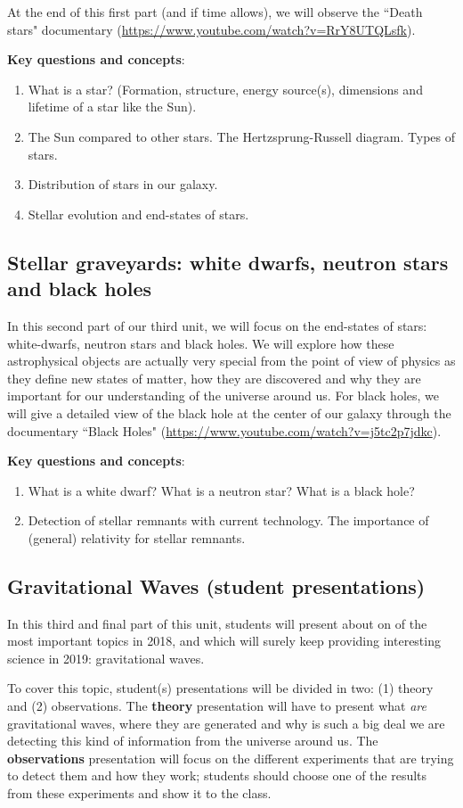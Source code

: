 \documentclass{tufte-handout}
\begin{document}
\begin{fullwidth}
At the end of this first part (and if time allows), we will observe the ``Death stars" documentary (\url{https://www.youtube.com/watch?v=RrY8UTQLsfk}).

\vspace{0.5 cm}
\noindent \textbf{Key questions and concepts}:
\begin{enumerate}
\item What is a star? (Formation, structure, energy source(s), dimensions and lifetime of a star like the Sun).
\item The Sun compared to other stars. The Hertzsprung-Russell diagram. Types of stars. 
\item Distribution of stars in our galaxy.
\item Stellar evolution and end-states of stars.
\end{enumerate}

\subsection{Stellar graveyards: white dwarfs, neutron stars and black holes}
In this second part of our third unit, we will focus on the end-states of stars: white-dwarfs, neutron stars and black holes. We will explore how these 
astrophysical objects are actually very special from the point of view of physics as they define new states of matter, how they are discovered and why 
they are important for our understanding of the universe around us. For black holes, we will give a detailed view of the black hole at the center of our 
galaxy through the documentary ``Black Holes" (\url{https://www.youtube.com/watch?v=j5tc2p7jdkc}).

\vspace{0.5 cm}
\noindent \textbf{Key questions and concepts}:
\begin{enumerate}
\item What is a white dwarf? What is a neutron star? What is a black hole?
\item Detection of stellar remnants with current technology. The importance of (general) relativity for stellar remnants.
\end{enumerate}

\subsection{Gravitational Waves (student presentations)}
In this third and final part of this unit, students will present about on of the most important topics in 2018, and which will surely keep providing 
interesting science in 2019: gravitational waves.

To cover this topic, student(s) presentations will be divided in two: (1) theory and (2) observations. The \textbf{theory} presentation will have to 
present what \textit{are} gravitational waves, where they are generated and why is such a big deal we are detecting this kind of information from the 
universe around us. The \textbf{observations} presentation will focus on the different experiments that are trying to detect them and how they work; 
students should choose one of the results from these experiments and show it to the class.

\end{fullwidth}
\end{document}
